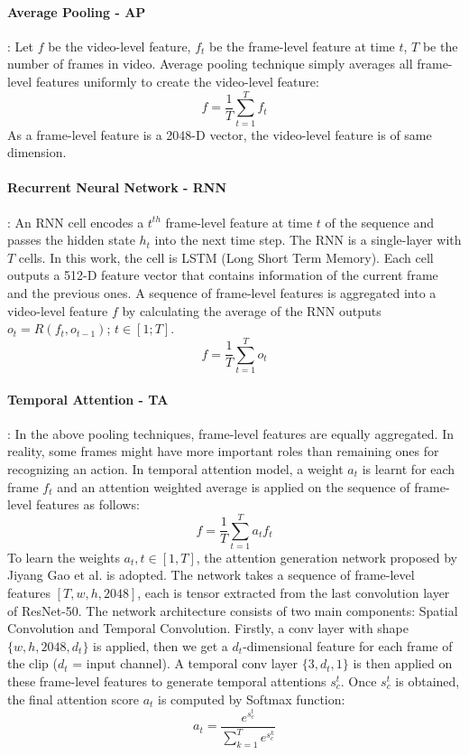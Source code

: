     \paragraph{Average Pooling - AP}: Let ${f}$ be the video-level feature, ${f_t}$ be the frame-level feature at time ${t}$, $T$ be the number of frames in video. Average pooling technique simply averages all frame-level features uniformly to create the video-level feature:
    \begin{equation}
        f=\frac{1}{T}\sum_{t=1}^T{f_t}
    \end{equation}
    As a frame-level feature is a 2048-D vector, the video-level feature is of same dimension.\\

    \paragraph{Recurrent Neural Network - RNN}: An RNN cell encodes a $t^{th}$ frame-level feature at time $t$ of the sequence and passes the hidden state $h_t$ into the next time step. The RNN is a single-layer with $T$ cells. In this work, the cell is LSTM (Long Short Term Memory). Each cell outputs a 512-D feature vector that contains information of the current frame and the previous ones. A sequence of frame-level features is aggregated into a video-level feature $f$ by calculating the average of the RNN outputs $o_t = R(f_t, o_{t-1})$; $t \in [1;T]$. 
    \begin{equation}
        f=\frac{1}{T}\sum_{t=1}^T{o_t}
    \end{equation}

    \paragraph{Temporal Attention - TA}: In the above pooling techniques, frame-level features are equally aggregated. In reality, some frames might have more important roles than remaining ones for recognizing an action. In temporal attention model, a weight $a_t$ is learnt for each frame $f_t$ and an attention weighted average is applied on the sequence of frame-level features as follows:
    \begin{equation}
        f=\frac{1}{T} \sum_{t=1}^{T}a_{t}f_{t}
    \end{equation}
    To learn the weights $a_t, t \in [1, T]$, the attention generation network proposed by Jiyang Gao et al. \cite{gao2018revisiting} is adopted. The network takes a sequence of frame-level features $[T, w, h, 2048]$, each is tensor extracted from the last convolution layer of ResNet-50. The network architecture consists of two main components: Spatial Convolution and Temporal Convolution. Firstly, a conv layer with shape $\{w, h, 2048, d_t\}$ is applied, then we get a $d_t$-dimensional feature for each frame of the clip ($d_t$ = input channel). A temporal conv layer $\{3, d_t, 1\}$ is then applied on these frame-level features to generate temporal attentions $s_c^t$. Once $s_c^t$ is obtained, the final attention score $a_t$ is computed by Softmax function:
    \begin{equation}
        a_t = \frac{e^{s_c^t}}{\sum_{k=1}^{T}e^{s_c^k}}
    \end{equation}

